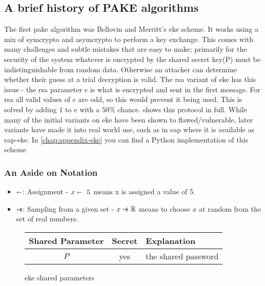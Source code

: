 \clearpage

\subsection{A brief history of PAKE algorithms}
The first \gls{pake} algorithm was Bellovin and Merritt's \gls{eke} scheme\cite{eke}.
It works using a mix of \gls{symcrypto} and \gls{asymcrypto} to perform a key exchange.
This comes with many challenges and subtle mistakes that are easy to make;
primarily for the security of the system whatever is encrypted by the shared secret key(P) must be indistinguishable from random data.
Otherwise an attacker can determine whether their guess at a trial decryption is valid.
The \gls{rsa} variant of \gls{eke} has this issue - the \gls{rsa} parameter $e$ is what is encrypted and sent in the first message.
For \gls{rsa} all valid values of $e$ are odd, so this would prevent it being used.
This is solved by adding $1$ to $e$ with a $50\%$ chance.
 shows this protocol in full. While many of the initial variants on \gls{eke} have been shown to flawed/vulnerable, later variants have made it into real world use, such as in \gls{eap}\cite{eap} where it is available as \gls{eap}-\gls{eke}\cite{eap-eke}.
In \cref{chap:appendix-eke} you can find a Python implementation of this scheme

\subsubsection{An Aside on Notation}
\begin{itemize}
  \item $\shortleftarrow$: Assignment - $x \shortleftarrow \ 5$ means x is assigned a value of 5.
  \item $\shortleftarrow\kern-1.5ex\text{\scriptsize \$}$: Sampling from a given set - $x \cryptoSample \ \mathbb{R}$ means to choose $x$ at random from the set of real numbers.
\end{itemize}

\begin{figure}[H]
  \centering

  \begin{tabular}{ |c|c|l| }
    \hline
    Shared Parameter & Secret & Explanation \\
    \hline
    $P$ & yes & the shared password \\ \hline
  \end{tabular}

  \caption{\gls{eke} shared parameters}
  \label{fig:eke-shared-params}
\end{figure}

